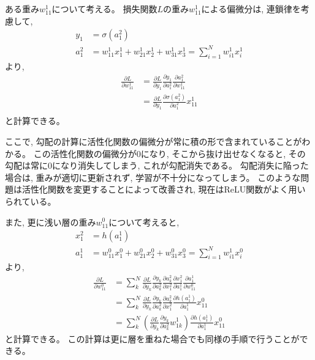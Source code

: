ある重み$w^1_{11}$について考える。
損失関数$L$の重み$w^1_{11}$による偏微分は, 連鎖律を考慮して, 
\begin{equation}
 \begin{split}
  y_1 &= \sigma(a^2_1)\\
  a^2_1 &= w^1_{11} x^1_1 + w^1_{21} x^1_2 + w^1_{31} x^1_3 = \sum^N_{i=1} w^1_{i1} x^1_i
 \end{split}
\end{equation}
より, 
\begin{equation}
 \begin{split}
  \frac{\partial L}{\partial w^1_{11}} 
  &= \frac{\partial L}{\partial y_1}\frac{\partial y_1}{\partial a^2_1}\frac{\partial a^2_1}{\partial w^1_{11}}\\
  &= \frac{\partial L}{\partial y_1}\frac{\partial \sigma(a^2_1)}{\partial a^2_1}x^1_{11}\\
 \end{split}
\end{equation}
と計算できる。

ここで, 勾配の計算に活性化関数の偏微分が常に積の形で含まれていることがわかる。
この活性化関数の偏微分が$0$になり, そこから抜け出せなくなると, その勾配は常に$0$になり消失してしまう, これが勾配消失である。
勾配消失に陥った場合は, 重みが適切に更新されず, 学習が不十分になってしまう。
このような問題は活性化関数を変更することによって改善され, 現在はReLU関数がよく用いられている。

また, 更に浅い層の重み$w^0_{11}$について考えると, 
\begin{equation}
 \begin{split}
  x^2_1 &= h(a^1_1)\\
  a^1_1 &= w^0_{11} x^0_1 + w^0_{21} x^0_2 + w^0_{31} x^0_3 = \sum^N_{i=1} w^1_{i1} x^0_i
 \end{split}
\end{equation}
より, 
\begin{equation}
 \begin{split}
  \frac{\partial L}{\partial w^0_{11}} 
  &= \sum^N_{k} \frac{\partial L}{\partial y_k}\frac{\partial y_k}{\partial a^2_k}\frac{\partial a^2_k}{\partial x^2_1}\frac{\partial x^2_1}{\partial a^1_1}\frac{\partial a^1_1}{\partial w^0_{11}}\\
  &= \sum^N_{k} \frac{\partial L}{\partial y_k}\frac{\partial y_k}{\partial a^2_k}\frac{\partial a^2_k}{\partial x^2_1}\frac{\partial h(a^1_1)}{\partial a^1_1}x^0_{11}\\
  &= \sum^N_{k} \left(\frac{\partial L}{\partial y_k}\frac{\partial y_k}{\partial a^2_k}w^1_{1k}\right)\frac{\partial h(a^1_1)}{\partial a^1_1}x^0_{11}
 \end{split}
\end{equation}
と計算できる。
この計算は更に層を重ねた場合でも同様の手順で行うことができる。

